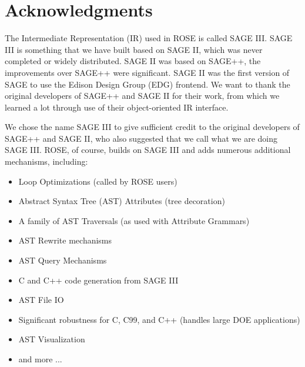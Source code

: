
\chapter*{Acknowledgments}

% 
% 

   The Intermediate Representation (IR) used in ROSE is called SAGE III.
SAGE III is something that we have built based on SAGE II, which was never 
completed or widely distributed. SAGE II was based on SAGE++, the improvements 
over SAGE++ were significant. SAGE II was the first version of SAGE to use the 
Edison Design Group (EDG) frontend.  We want to thank the original
developers of SAGE++ and SAGE II for their work, from which we learned a lot
through use of their object-oriented IR interface.

   We chose the name SAGE III to give sufficient credit to the original developers
of SAGE++ and SAGE II, who also suggested that we call what we are doing SAGE III.  
ROSE, of course, builds on SAGE III and adds numerous additional mechanisms, 
including:
\begin{itemize}
    \item Loop Optimizations (called by ROSE users)
    \item Abstract Syntax Tree (AST) Attributes (tree decoration)
    \item A family of AST Traversals (as used with Attribute Grammars)
    \item AST Rewrite mechanisms
    \item AST Query Mechanisms
    \item C and C++ code generation from SAGE III
    \item AST File I\/O
    \item Significant robustness for C, C99, and C++ (handles large DOE applications)
    \item AST Visualization
    \item and more ...
\end{itemize}

